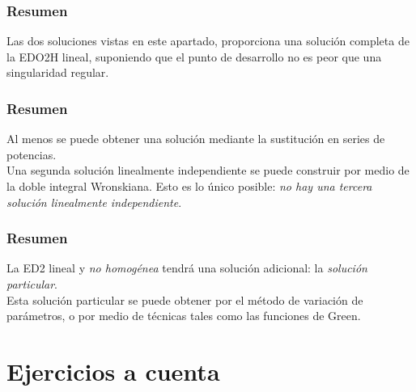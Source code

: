 \begin{frame}
\frametitle{Resumen}
Las dos soluciones vistas en este apartado, proporciona una solución completa de la EDO2H lineal, suponiendo que el punto de desarrollo no es peor que una singularidad regular. 
\end{frame}
\begin{frame}
\frametitle{Resumen}
Al menos se puede obtener una solución mediante la sustitución en series de potencias.
\\
\bigskip
Una segunda solución linealmente independiente se puede construir por medio de la doble integral Wronskiana. Esto es lo único posible: \emph{no hay una tercera solución linealmente independiente}.
\end{frame}
\begin{frame}
\frametitle{Resumen}
La ED2 lineal y \textit{no homogénea} tendrá una solución adicional: la \emph{solución particular}.
\\
\bigskip
Esta solución particular se puede obtener por el método de variación de parámetros, o por medio de técnicas tales como las funciones de Green.
\end{frame}
\section{Ejercicios a cuenta}
